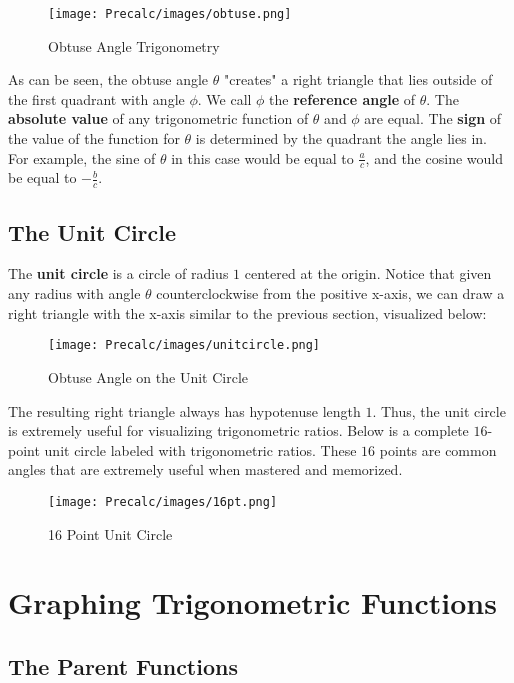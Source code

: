 \documentclass[11pt]{article}
\begin{document}
\begin{figure}[H]
    \centering
    \texttt{[image: Precalc/images/obtuse.png]}
    \caption{Obtuse Angle Trigonometry}
    \label{fig:obtuse}
\end{figure}

As can be seen, the obtuse angle $\theta$ "creates" a right triangle that lies outside of the first quadrant with angle $\phi$. We call $\phi$ the \textbf{reference angle} of $\theta$. The \textbf{absolute value} of any trigonometric function of $\theta$ and $\phi$ are equal. The \textbf{sign} of the value of the function for $\theta$ is determined by the quadrant the angle lies in. For example, the sine of $\theta$ in this case would be equal to $\frac{a}{c}$, and the cosine would be equal to $-\frac{b}{c}$.

\subsection{The Unit Circle}
The \textbf{unit circle} is a circle of radius $1$ centered at the origin. Notice that given any radius with angle $\theta$ counterclockwise from the positive x-axis, we can draw a right triangle with the x-axis similar to the previous section, visualized below:



\begin{figure}[H]
    \centering
    \texttt{[image: Precalc/images/unitcircle.png]}
    \caption{Obtuse Angle on the Unit Circle}
    \label{fig:unitcircle}
\end{figure}


The resulting right triangle always has hypotenuse length $1$. Thus, the unit circle is extremely useful for visualizing trigonometric ratios. Below is a complete $16$-point unit circle labeled with trigonometric ratios. These $16$ points are common angles that are extremely useful when mastered and memorized.

\begin{figure}[H]
    \centering
    \texttt{[image: Precalc/images/16pt.png]}
    \caption{16 Point Unit Circle}
    \label{fig:16pt}
\end{figure}

\section{Graphing Trigonometric Functions}

\subsection{The Parent Functions}
\end{document}
